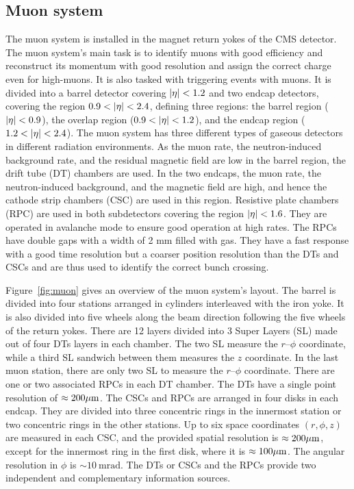 \subsection{Muon system}

The muon system is installed in the magnet return yokes of the CMS detector. The muon system's main task is to identify muons with good efficiency and reconstruct its momentum with good resolution and assign the correct charge even for high-\pt muons. It is also tasked with triggering events with muons. It is divided into a barrel detector covering $\lvert\eta\rvert < 1.2$ and two endcap detectors, covering the region $0.9 < \lvert\eta\rvert < 2.4$, defining three regions: the barrel region ($\lvert\eta\rvert < 0.9$), the overlap region ($0.9 < \lvert\eta\rvert < 1.2$), and the endcap region ($1.2 < \lvert\eta\rvert < 2.4$). The muon system has three different types of gaseous detectors in different radiation environments. As the muon rate, the neutron-induced background rate, and the residual magnetic field are low in the barrel region, the drift tube (DT) chambers are used. In the two endcaps, the muon rate, the neutron-induced background, and the magnetic field are high, and hence the cathode strip chambers (CSC) are used in this region. Resistive plate chambers (RPC) are used in both subdetectors covering the region $\lvert\eta\rvert < 1.6$. They are operated in avalanche mode to ensure good operation at high rates. The RPCs have double gaps with a width of 2 mm filled with gas. They have a fast response with a good time resolution but a coarser position resolution than the DTs and CSCs and are thus used to identify the correct bunch crossing.

Figure~\ref{fig:muon} gives an overview of the muon system's layout. The barrel is divided into four stations arranged in cylinders interleaved with the iron yoke. It is also divided into five wheels along the beam direction following the five wheels of the return yokes. There are 12 layers divided into 3 Super Layers (SL) made out of four DTs layers in each chamber. The two SL measure the $r$--$\phi$ coordinate, while a third SL sandwich between them measures the $z$ coordinate. In the last muon station, there are only two SL to measure the $r$--$\phi$ coordinate. There are one or two associated RPCs in each DT chamber. The DTs have a single point resolution of $\approx 200 \mu \text{m}$. The CSCs and RPCs are arranged in four disks in each endcap. They are divided into three concentric rings in the innermost station or two concentric rings in the other stations. Up to six space coordinates $(r, \phi, z)$ are measured in each CSC, and the provided spatial resolution is $\approx 200 \mu \text{m}$, except for the innermost ring in the first disk, where it is $\approx 100 \mu \text{m}$. The angular resolution in $\phi$ is $\sim 10~\text{mrad}$. The DTs or CSCs and the RPCs provide two independent and complementary information sources.

